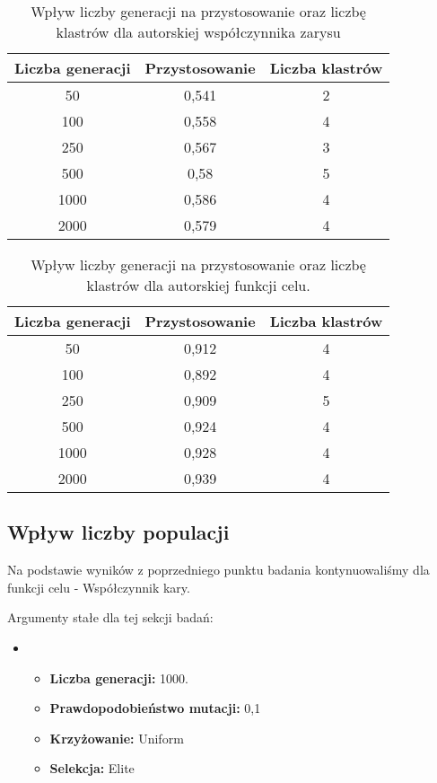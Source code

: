 \documentclass{classrep}
\begin{document}
\begin{table}[H]
\centering
\caption{Wpływ liczby generacji na przystosowanie oraz liczbę klastrów dla autorskiej współczynnika zarysu}
\begin{tabular}{|c|c|c|}
\hline
\textbf{Liczba generacji} & {\textbf{Przystosowanie}} & {\textbf{Liczba klastrów}} \\ \hline
50 & 0,541 & 2 \\ \hline
100 & 0,558 & 4 \\ \hline
250 & 0,567 & 3 \\ \hline
500 & 0,58 & 5 \\ \hline
1000 & 0,586 & 4 \\ \hline
2000 & 0,579 & 4 \\ \hline
\end{tabular}
\label{tab:calc3_1}
\end{table}

\begin{table}[H]
\centering
\caption{Wpływ liczby generacji na przystosowanie oraz liczbę klastrów dla autorskiej funkcji celu.}
\begin{tabular}{|c|c|c|}
\hline
\textbf{Liczba generacji} & {\textbf{Przystosowanie}} & {\textbf{Liczba klastrów}} \\ \hline
50 & 0,912 & 4 \\ \hline
100 & 0,892 & 4 \\ \hline
250 & 0,909 & 5 \\ \hline
500 & 0,924 & 4 \\ \hline
1000 & 0,928 & 4 \\ \hline
2000 & 0,939 & 4 \\ \hline
\end{tabular}
\label{tab:calc3_2}
\end{table}

\subsection{Wpływ liczby populacji}

Na podstawie wyników z poprzedniego punktu badania kontynuowaliśmy dla funkcji celu - Współczynnik kary. 

Argumenty stałe dla tej sekcji badań:
\begin{itemize}
    \item[]
    \begin{itemize}
        \item \textbf{Liczba generacji:} 1000.
        \item \textbf{Prawdopodobieństwo mutacji:} 0,1
        \item \textbf{Krzyżowanie:} Uniform
        \item \textbf{Selekcja:} Elite
    \end{itemize}
\end{itemize}
\end{document}
